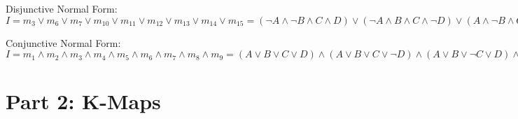 \documentclass[11pt]{article}
\begin{document}
Disjunctive Normal Form: $I = m_3 \lor m_6 \lor m_7 \lor m_{10} \lor m_{11} \lor m_{12} \lor m_{13} \lor m_{14} \lor m_{15} =(\lnot A \land \lnot B \land C \land D) \lor (\lnot A \land  B \land  C \land\lnot D) \lor ( A \land  \lnot B \land C \land \lnot D) \lor (A \land  \lnot B \land C \land \lnot D) \lor ( A \land \lnot B \land C \land D ) \lor (A \land  B \land\lnot C \land\lnot D) \lor (A \land  B \land\lnot C \land D) \lor (A \land  B \land C \land\lnot D) \lor (A \land  B \land C \land\lnot D) \lor (A \land  B \land C \land D)  \lor (A \land  B \land C \land D)  $

Conjunctive Normal Form: $I = m_1 \land m_2 \land m_3 \land m_4 \land m_5 \land m_6 \land m_7 \land m_8 \land m_9 =  ( A \lor  B \lor C \lor  D)\land (A \lor  B \lor C \lor \lnot D) \land (A \lor  B \lor\lnot C \lor  D) \land(A \lor \lnot B \lor C \lor  D)\land(A \lor \lnot B \lor\lnot C \lor \lnot D)\land(\lnot A \lor  B \lor C \lor  D) \land (\lnot A \lor  B \lor C \lor \lnot D)$

\section{Part 2: K-Maps}



\end{document}
